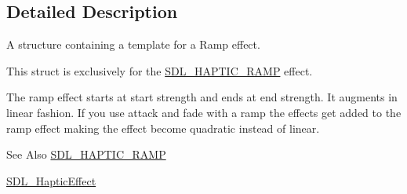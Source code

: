 \subsection{Detailed Description}
A structure containing a template for a Ramp effect. 

This struct is exclusively for the \hyperlink{_s_d_l__haptic_8h_af10eb937a64a8f602e9c46682ac0d868}{S\-D\-L\-\_\-\-H\-A\-P\-T\-I\-C\-\_\-\-R\-A\-M\-P} effect.

The ramp effect starts at start strength and ends at end strength. It augments in linear fashion. If you use attack and fade with a ramp the effects get added to the ramp effect making the effect become quadratic instead of linear.

\begin{DoxySeeAlso}{See Also}
\hyperlink{_s_d_l__haptic_8h_af10eb937a64a8f602e9c46682ac0d868}{S\-D\-L\-\_\-\-H\-A\-P\-T\-I\-C\-\_\-\-R\-A\-M\-P} 

\hyperlink{union_s_d_l___haptic_effect}{S\-D\-L\-\_\-\-Haptic\-Effect} 
\end{DoxySeeAlso}


